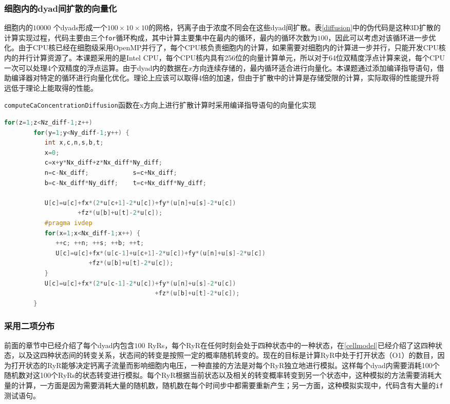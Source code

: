 \subsubsection{细胞内的dyad间扩散的向量化}
细胞内的$10000$ 个dyads形成一个$100\times10\times10$的网格，钙离子由于浓度不同会在这些dyad间扩散。表\ref{diffusion}中的伪代码是这种3D扩散的计算实现过程，代码主要由三个{\tt for}循环构成，其中计算主要集中在最内的循环，最内的循环次数为$100$，因此可以考虑对该循环进一步优化。由于CPU核已经在细胞级采用OpenMP并行了，每个CPU核负责细胞内的计算，如果需要对细胞内的计算进一步并行，只能开发CPU核内的并行计算资源了。本课题采用的是Intel CPU，每个CPU核内具有256位的向量计算单元，所以对于64位双精度浮点计算来说，每个CPU一次可以处理4个双精度的浮点运算。由于dyad内的数据在$x$方向连续存储的，最内循环适合进行向量化。本课题通过添加编译指导语句，借助编译器对特定的循环进行向量化优化。理论上应该可以取得4倍的加速，但由于扩散中的计算是存储受限的计算，实际取得的性能提升将远低于理论上能取得的性能。

 \begin{table}
\caption{{\tt computeCaConcentrationDiffusion}函数在x方向上进行扩散计算时采用编译指导语句的向量化实现}
\label{diffusion}
\begin{lstlisting}[language=C++, basicstyle=\ttfamily\footnotesize]
for(z=1;z<Nz_diff-1;z++)
        for(y=1;y<Ny_diff-1;y++) {     
           int x,c,n,s,b,t;         
           x=0;
           c=x+y*Nx_diff+z*Nx_diff*Ny_diff;
           n=c-Nx_diff;            s=c+Nx_diff;
           b=c-Nx_diff*Ny_diff;    t=c+Nx_diff*Ny_diff; 
           
           U[c]=u[c]+fx*(2*u[c+1]-2*u[c])+fy*(u[n]+u[s]-2*u[c])
                    +fz*(u[b]+u[t]-2*u[c]);
           #pragma ivdep
           for(x=1;x<Nx_diff-1;x++) {
              ++c; ++n; ++s; ++b; ++t;
              U[c]=u[c]+fx*(u[c-1]+u[c+1]-2*u[c])+fy*(u[n]+u[s]-2*u[c])
                       +fz*(u[b]+u[t]-2*u[c]);              
           }
           U[c]=u[c]+fx*(2*u[c-1]-2*u[c])+fy*(u[n]+u[s]-2*u[c])
                                         +fz*(u[b]+u[t]-2*u[c]);
        }   \end{lstlisting}
\end{table}


\subsubsection{采用二项分布}
\label{binom}
%
前面的章节中已经介绍了每个dyad内包含$100$ RyRs，每个RyR在任何时刻会处于四种状态中的一种状态，在\ref{cellmodel}已经介绍了这四种状态，以及这四种状态间的转变关系，状态间的转变是按照一定的概率随机转变的。现在的目标是计算RyR中处于打开状态（O1）的数目，因为打开状态的RyR能够决定钙离子流量而影响细胞内电压，一种直接的方法是对每个RyR独立地进行模拟。这样每个dyad内需要消耗100个随机数对这100个RyRs的状态转变进行模拟。每个RyR根据当前状态以及相关的转变概率转变到另一个状态中，这种模拟的方法需要消耗大量的计算，一方面是因为需要消耗大量的随机数，随机数在每个时间步中都需要重新产生；另一方面，这种模拟实现中，代码含有大量的{\tt if}测试语句。

